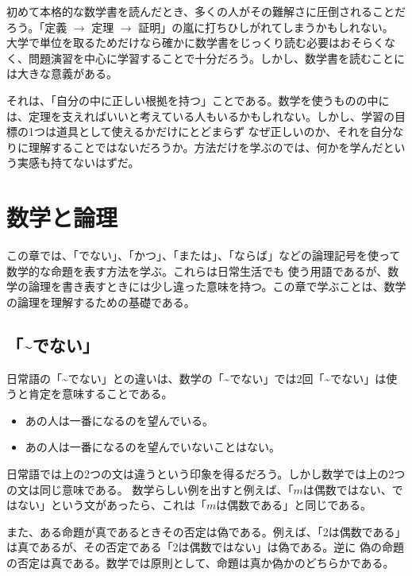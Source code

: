 \documentclass{jlreq}
\begin{document}
\newpage
\begin{tcolorbox}[enhanced, title=コラム 数学書で数学を学ぶ意義, breakable, colback=white, drop fuzzy shadow, attach boxed title to top center={yshift*=0.1cm}]
  初めて本格的な数学書を読んだとき、多くの人がその難解さに圧倒されることだろう。「定義 $\rightarrow$ 定理 $\rightarrow$ 証明」の嵐に打ちひしがれてしまうかもしれない。
  大学で単位を取るためだけなら確かに数学書をじっくり読む必要はおそらくなく、問題演習を中心に学習することで十分だろう。しかし、数学書を読むことには大きな意義がある。

  それは、「自分の中に正しい根拠を持つ」ことである。数学を使うものの中には、定理を支えればいいと考えている人もいるかもしれない。しかし、学習の目標の1つは道具として使えるかだけにとどまらず
  なぜ正しいのか、それを自分なりに理解することではないだろうか。方法だけを学ぶのでは、何かを学んだという実感も持てないはずだ。
\end{tcolorbox}

\newpage

\section{数学と論理}
この章では、「でない」、「かつ」、「または」、「ならば」などの論理記号を使って数学的な命題を表す方法を学ぶ。これらは日常生活でも
使う用語であるが、数学の論理を書き表すときには少し違った意味を持つ。この章で学ぶことは、数学の論理を理解するための基礎である。


\subsection{「\~{}でない」}
日常語の「\~{}でない」との違いは、数学の「\~{}でない」では2回「\~{}でない」は使うと肯定を意味することである。

\begin{itemize}
  \item あの人は一番になるのを望んでいる。
  \item あの人は一番になるのを望んでいないことはない。
\end{itemize}

日常語では上の2つの文は違うという印象を得るだろう。しかし数学では上の2つの文は同じ意味である。
数学らしい例を出すと例えば、「$m$は偶数ではない、ではない」という文があったら、これは「$m$は偶数である」と同じである。

また、ある命題が真であるときその否定は偽である。例えば、「2は偶数である」は真であるが、その否定である「2は偶数ではない」は偽である。逆に
偽の命題の否定は真である。数学では原則として、命題は真か偽かのどちらかである。
\end{document}
